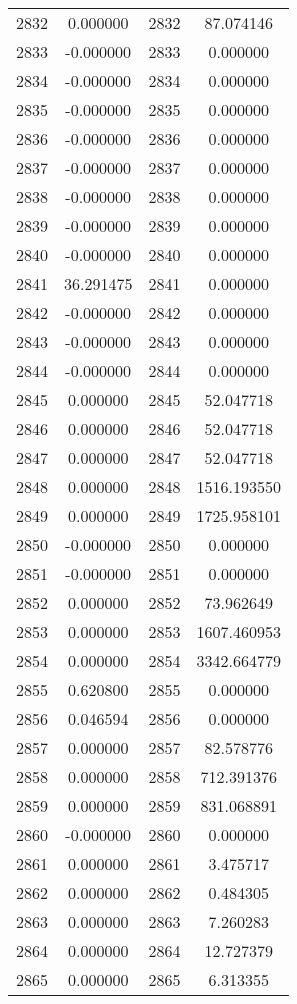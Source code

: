 \documentclass[12pt]{article}
\begin{document}
\begin{longtable}{@{}cccc@{}}
2832 & 0.000000 & 2832 & 87.074146 \\
2833 & -0.000000 & 2833 & 0.000000 \\
2834 & -0.000000 & 2834 & 0.000000 \\
2835 & -0.000000 & 2835 & 0.000000 \\
2836 & -0.000000 & 2836 & 0.000000 \\
2837 & -0.000000 & 2837 & 0.000000 \\
2838 & -0.000000 & 2838 & 0.000000 \\
2839 & -0.000000 & 2839 & 0.000000 \\
2840 & -0.000000 & 2840 & 0.000000 \\
2841 & 36.291475 & 2841 & 0.000000 \\
2842 & -0.000000 & 2842 & 0.000000 \\
2843 & -0.000000 & 2843 & 0.000000 \\
2844 & -0.000000 & 2844 & 0.000000 \\
2845 & 0.000000 & 2845 & 52.047718 \\
2846 & 0.000000 & 2846 & 52.047718 \\
2847 & 0.000000 & 2847 & 52.047718 \\
2848 & 0.000000 & 2848 & 1516.193550 \\
2849 & 0.000000 & 2849 & 1725.958101 \\
2850 & -0.000000 & 2850 & 0.000000 \\
2851 & -0.000000 & 2851 & 0.000000 \\
2852 & 0.000000 & 2852 & 73.962649 \\
2853 & 0.000000 & 2853 & 1607.460953 \\
2854 & 0.000000 & 2854 & 3342.664779 \\
2855 & 0.620800 & 2855 & 0.000000 \\
2856 & 0.046594 & 2856 & 0.000000 \\
2857 & 0.000000 & 2857 & 82.578776 \\
2858 & 0.000000 & 2858 & 712.391376 \\
2859 & 0.000000 & 2859 & 831.068891 \\
2860 & -0.000000 & 2860 & 0.000000 \\
2861 & 0.000000 & 2861 & 3.475717 \\
2862 & 0.000000 & 2862 & 0.484305 \\
2863 & 0.000000 & 2863 & 7.260283 \\
2864 & 0.000000 & 2864 & 12.727379 \\
2865 & 0.000000 & 2865 & 6.313355 \\

\end{longtable}
\end{document}
